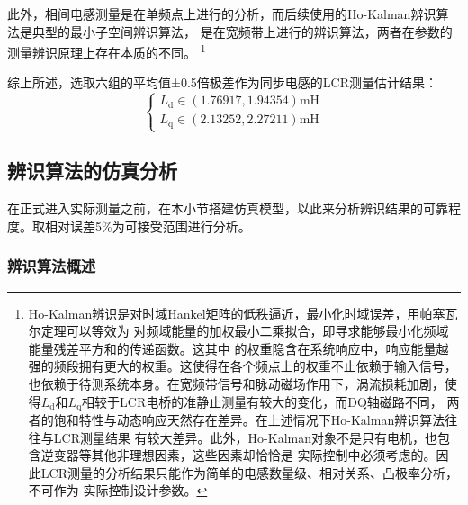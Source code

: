 此外，相间电感测量是在单频点上进行的分析，而后续使用的Ho-Kalman辨识算法是典型的最小子空间辨识算法，
是在宽频带上进行的辨识算法，两者在参数的测量辨识原理上存在本质的不同。
\footnote{Ho-Kalman辨识是对时域Hankel矩阵的低秩逼近，最小化时域误差，用帕塞瓦尔定理可以等效为
对频域能量的加权最小二乘拟合，即寻求能够最小化频域能量残差平方和的传递函数。这其中
的权重隐含在系统响应中，响应能量越强的频段拥有更大的权重。这使得在各个频点上的权重不止依赖于输入信号，
也依赖于待测系统本身。在宽频带信号和脉动磁场作用下，涡流损耗加剧，使
得\(L_{\mathrm{d}}\)和\(L_{\mathrm{q}}\)相较于LCR电桥的准静止测量有较大的变化，而DQ轴磁路不同，
两者的饱和特性与动态响应天然存在差异。在上述情况下Ho-Kalman辨识算法往往与LCR测量结果
有较大差异。此外，Ho-Kalman对象不是只有电机，也包含逆变器等其他非理想因素，这些因素却恰恰是
实际控制中必须考虑的。因此LCR测量的分析结果只能作为简单的电感数量级、相对关系、凸极率分析，不可作为
实际控制设计参数。}

综上所述，选取六组的平均值±0.5倍极差作为同步电感的LCR测量估计结果：
\begin{equation*}
    \begin{cases}
        L_{\mathrm{d}}\in(1.76917,1.94354)\textrm{mH}
        \\
        L_{\mathrm{q}}\in(2.13252,2.27211)\textrm{mH}
    \end{cases}
\end{equation*}

\subsection{辨识算法的仿真分析}
在正式进入实际测量之前，在本小节搭建仿真模型，以此来分析辨识结果的可靠程度。取相对误差5\%为可接受范围进行分析。

\subsubsection{辨识算法概述}

